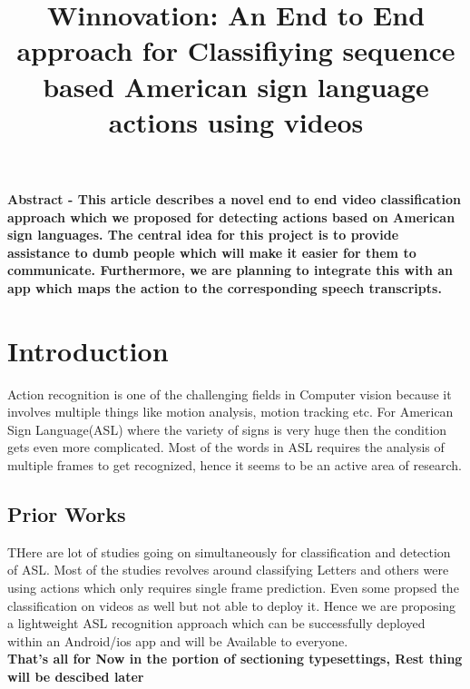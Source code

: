 \documentclass{article}
\title{Winnovation: An End to End approach for Classifiying sequence based American sign language actions using videos}
\begin{document}
  \maketitle
  
  \textbf{Abstract - This article describes a novel end to end video classification approach which we proposed for detecting actions based on American sign languages. The central idea for this project is to provide assistance to dumb people which will make it easier for them to communicate. Furthermore, we are planning to integrate this with an app which maps the action to the corresponding speech transcripts.}
  \section{Introduction}
  
     Action recognition is one of the challenging fields in Computer vision because it involves multiple things like motion analysis, motion tracking etc. For American Sign Language(ASL) where the variety of signs is very huge then the condition gets even more complicated. Most of the words in ASL requires the analysis of multiple frames to get recognized, hence it seems to be an active area of research.
  \subsection{Prior Works}
  
     THere are lot of studies going on simultaneously for classification and detection of ASL. Most of the studies revolves around classifying Letters and others were using actions which only requires single frame prediction. Even some propsed the classification on videos as well but not able to deploy it. Hence we are proposing a lightweight ASL recognition approach which can be successfully deployed within an Android/ios app and will be Available to everyone.\\
     
  \textbf{That's all for Now in the portion of sectioning typesettings, Rest thing will be descibed later}   
     
     
\end{document}
